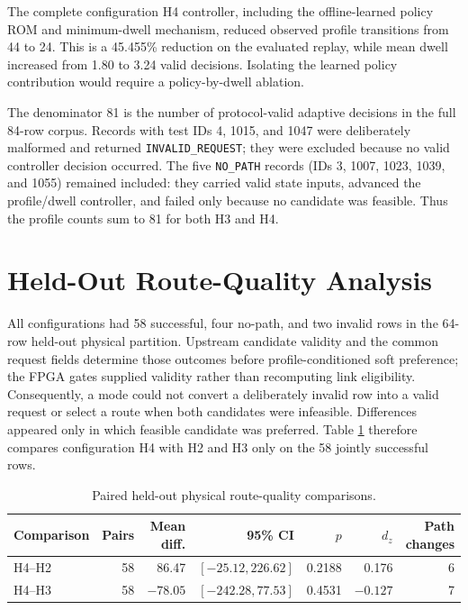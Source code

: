 The complete configuration H4 controller, including the offline-learned policy ROM
and minimum-dwell mechanism, reduced observed profile transitions from 44 to 24.
This is a 45.455\% reduction on the evaluated replay, while mean dwell increased
from 1.80 to 3.24 valid decisions. Isolating the learned policy contribution would
require a policy-by-dwell ablation.

The denominator 81 is the number of protocol-valid adaptive decisions in the full
84-row corpus. Records with test IDs 4, 1015, and 1047 were deliberately malformed
and returned \texttt{INVALID\_REQUEST}; they were excluded because no valid
controller decision occurred. The five \texttt{NO\_PATH} records (IDs 3, 1007,
1023, 1039, and 1055) remained included: they carried valid state inputs, advanced
the profile/dwell controller, and failed only because no candidate was feasible.
Thus the profile counts sum to 81 for both H3 and H4.

\section{Held-Out Route-Quality Analysis}

All configurations had 58 successful, four no-path, and two invalid rows in the
64-row held-out physical partition. Upstream candidate validity and the common
request fields determine those outcomes before profile-conditioned soft preference;
the FPGA gates supplied validity rather than recomputing link eligibility.
Consequently, a mode could not convert a deliberately invalid row into
a valid request or select a route when both candidates were infeasible. Differences
appeared only in which feasible candidate was preferred. Table
\ref{tab:pairwise-quality} therefore compares configuration H4 with H2 and H3 only
on the 58 jointly successful rows.

\begin{table}[H]
\centering
\caption{Paired held-out physical route-quality comparisons.}
\label{tab:pairwise-quality}
\begin{tabularx}{\textwidth}{@{}lrrrrrr@{}}
\toprule
\textbf{Comparison} & \textbf{Pairs} & \textbf{Mean diff.} &
\textbf{95\% CI} & \textbf{$p$} & \textbf{$d_z$} & \textbf{Path changes}\\
\midrule
H4--H2 & 58 & 86.47 & $[-25.12,226.62]$ & 0.2188 & 0.176 & 6\\
H4--H3 & 58 & $-78.05$ & $[-242.28,77.53]$ & 0.4531 & $-0.127$ & 7\\
\bottomrule
\end{tabularx}
\end{table}

